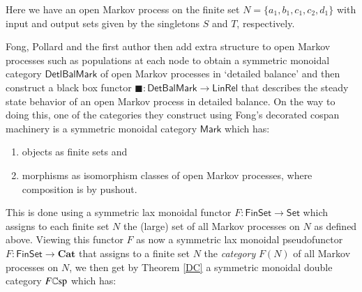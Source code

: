 \documentclass{amsart}
\begin{document}
Here we have an open Markov process on the finite set $N = \{a_1,b_1,c_1,c_2,d_1 \}$ with input and output sets given by the singletons $S$ and $T$, respectively.

Fong, Pollard and the first author then add extra structure to open Markov processes such as populations at each node to obtain a symmetric monoidal category $\mathsf{DetlBalMark}$ of open Markov processes in `detailed balance' and then construct a black box functor $\blacksquare \colon \mathsf{DetBalMark} \to \mathsf{LinRel}$ that describes the steady state behavior of an open Markov process in detailed balance. On the way to doing this, one of the categories they construct using Fong's decorated cospan machinery is a symmetric monoidal category $\mathsf{Mark}$ which has:
\begin{enumerate}
\item{objects as finite sets and}
\item{morphisms as isomorphism classes of open Markov processes, where composition is by pushout.}
\end{enumerate}
This is done using a symmetric lax monoidal functor $F \colon \mathsf{FinSet} \to \mathsf{Set}$ which assigns to each finite set $N$ the (large) set of all Markov processes on $N$ as defined above. Viewing this functor $F$ as now a symmetric lax monoidal pseudofunctor $F \colon \mathsf{FinSet} \to \mathbf{Cat}$ that assigns to a finite set $N$ the \emph{category} $F(N)$ of all Markov processes on $N$, we then get by Theorem \ref{DC} a symmetric monoidal double category $F\mathbb{C}\textnormal{sp}$ which has:
\end{document}
